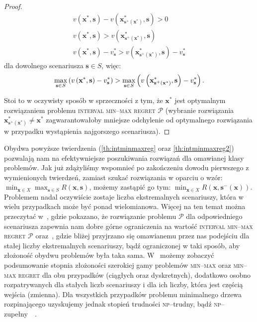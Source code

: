 \begin{proof}
	\begin{gather*}
	v \left( \textbf{x}^{\ast}, \textbf{s} \right) - v \left( \textbf{x}^{\ast}_{\textbf{s}^{+} \left( \textbf{x}^{\ast} \right)}, \textbf{s} \right) > 0 \\
	v \left( \textbf{x}^{\ast}, \textbf{s} \right) > v \left( \textbf{x}^{\ast}_{\textbf{s}^{+} \left( \textbf{x}^{\ast} \right)}, \textbf{s} \right) \\
	v \left( \textbf{x}^{\ast}, \textbf{s} \right) - v^{\ast}_{\textbf{s}} > v \left( \textbf{x}^{\ast}_{\textbf{s}^{+} \left( \textbf{x}^{\ast} \right)}, \textbf{s} \right) - v^{\ast}_{\textbf{s}}
	\end{gather*}
	dla dowolnego scenariusza $\textbf{s} \in S$, więc:
	\begin{equation*}
			\max_{\mathclap{\textbf{s} \in S}} \left( v \left( \textbf{x}^{\ast}, \textbf{s} \right) - v^{\ast}_{\textbf{s}} \right) > \max_{\mathclap{\textbf{s} \in S}} \left( v \left( \textbf{x}^{\ast}_{\textbf{s}^{+} \left( \textbf{x}^{\ast} \right)}, \textbf{s} \right) - v^{\ast}_{\textbf{s}} \right)\text{.}
	\end{equation*}
	
	Stoi to w oczywisty sposób w sprzeczności z tym, że $\textbf{x}^{\ast}$ jest optymalnym rozwiązaniem problemu \textsc{interval min--max regret $\mathcal{P}$} (wybranie rozwiązania $\textbf{x}^{\ast}_{\textbf{s}^{+} \left( \textbf{x}^{\ast} \right)} \neq \textbf{x}^{\ast}$ zagwarantowałoby mniejsze odchylenie od optymalnego rozwiązania w przypadku wystąpienia najgorszego scenariusza).
\end{proof}

Obydwa powyższe twierdzenia (\ref{th:intminmaxreg} oraz \ref{th:intminmaxreg2}) pozwalają nam na efektywniejsze poszukiwania rozwiązań dla omawianej klasy problemów. Jak już zdążyliśmy wspomnieć po zakończeniu dowodu pierwszego z wymienionych twierdzeń, zamiast szukać rozwiązania w oparciu o wzór: $\min_{\textbf{x} \in X} \max_{\textbf{s} \in S} R \left( \textbf{x}, \textbf{s} \right)$, możemy zastąpić go tym: $\min_{\textbf{x} \in X} R \left( \textbf{x}, \textbf{s}^{-} \left( \textbf{x} \right) \right)$. Problemem nadal oczywiście zostaje liczba ekstremalnych scenariuszy, która w wielu przypadkach może być ponad wielomianowa. Więcej na ten temat można przeczytać w~\cite{intervalregMST}, gdzie pokazano, że rozwiązanie problemu $\mathcal{P}$ dla odpowiedniego scenariusza zapewnia nam dobre górne ograniczenia na wartość \textsc{interval min--max regret $\mathcal{P}$} oraz~\cite{intervalregMST2}, gdzie bliżej przyjrzano się omawianemu przez nas podejściu dla stałej liczby ekstremalnych scenariuszy, bądź ograniczonej w taki sposób, aby złożoność obydwu problemów była taka sama. W~\cite[$433$--$434$]{minmaxSurvey} możemy zobaczyć podsumowanie stopnia złożoności szerokiej gamy problemów \textsc{min--max} oraz \textsc{min--max regret} dla obu przypadków (ciągłych oraz dyskretnych), dodatkowo osobno rozpatrywanych dla stałych liczb scenariuszy i dla ich liczby, która jest częścią wejścia (zmienna). Dla wszystkich przypadków problemu minimalnego drzewa rozpinającego uzyskujemy jednak stopień trudności \textsc{np}--trudny, bądź \textsc{np}--zupełny~\cite{minmaxApprox}~\cite{intervalregMST2}.


